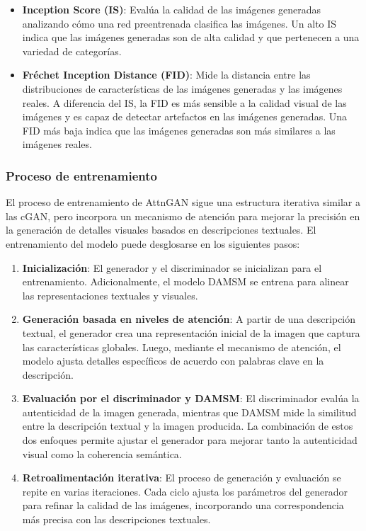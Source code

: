 \begin{itemize}
    \item \textbf{Inception Score (IS)}: Evalúa la calidad de las imágenes generadas analizando cómo una red preentrenada clasifica las imágenes. Un alto IS indica que las imágenes generadas son de alta calidad y que pertenecen a una variedad de categorías.
    
    \item \textbf{Fréchet Inception Distance (FID)}: Mide la distancia entre las distribuciones de características de las imágenes generadas y las imágenes reales. A diferencia del IS, la FID es más sensible a la calidad visual de las imágenes y es capaz de detectar artefactos en las imágenes generadas. Una FID más baja indica que las imágenes generadas son más similares a las imágenes reales.
\end{itemize}


\subsubsection{Proceso de entrenamiento}
El proceso de entrenamiento de AttnGAN sigue una estructura iterativa similar a las cGAN, pero incorpora un mecanismo de atención para mejorar la precisión en la generación de detalles visuales basados en descripciones textuales. El entrenamiento del modelo puede desglosarse en los siguientes pasos:
\begin{enumerate} 
    \item \textbf{Inicialización}: El generador y el discriminador se inicializan para el entrenamiento. Adicionalmente, el modelo DAMSM se entrena para alinear las representaciones textuales y visuales.
    \item \textbf{Generación basada en niveles de atención}: A partir de una descripción textual, el generador crea una representación inicial de la imagen que captura las características globales. Luego, mediante el mecanismo de atención, el modelo ajusta detalles específicos de acuerdo con palabras clave en la descripción.
    \item \textbf{Evaluación por el discriminador y DAMSM}: El discriminador evalúa la autenticidad de la imagen generada, mientras que DAMSM mide la similitud entre la descripción textual y la imagen producida. La combinación de estos dos enfoques permite ajustar el generador para mejorar tanto la autenticidad visual como la coherencia semántica.
    \item \textbf{Retroalimentación iterativa}: El proceso de generación y evaluación se repite en varias iteraciones. Cada ciclo ajusta los parámetros del generador para refinar la calidad de las imágenes, incorporando una correspondencia más precisa con las descripciones textuales.
\end{enumerate}

